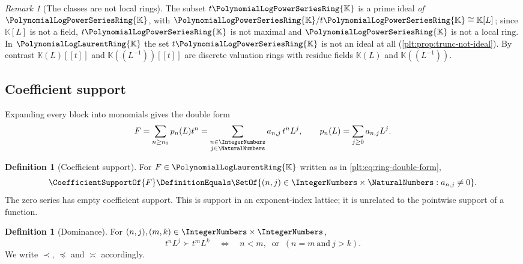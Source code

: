 \documentclass[11pt,oneside]{article}
\theoremstyle{plain}
\theoremstyle{definition}
\newtheorem{definition}[theorem]{Definition}
\theoremstyle{remark}
\newtheorem{remark}[theorem]{Remark}
\newcommand{\K}{\mathbb{K}}
\newcommand{\PLpow}{\PolynomialLogPowerSeriesRing{\K}}   %
\newcommand{\PLlau}{\PolynomialLogLaurentRing{\K}}       %
\newcommand{\precdom}{\prec}
\newcommand{\succdom}{\succ}
\newcommand{\preceqdom}{\preccurlyeq}
\newcommand{\asymdom}{\asymp}
\begin{document}
\begin{remark}[The classes are not local rings]
\label{plt:rmk:ring-not-local}
The subset \(t\PLpow\) is a prime ideal \emph{of \(\PLpow\)}, with
\(\PLpow/t\PLpow\cong\K[L]\); since \(\K[L]\) is not a field, \(t\PLpow\) is
not maximal and \(\PLpow\) is not a local ring.  In \(\PLlau\) the set
\(t\PLpow\) is not an ideal at all
(\cref{plt:prop:trunc-not-ideal}).  By contrast \(\K(L)[[t]]\) and
\(\K((L^{-1}))[[t]]\) are discrete valuation rings with residue fields
\(\K(L)\) and \(\K((L^{-1}))\).
\end{remark}

\subsection{Coefficient support}
\label{plt:sec:ring-support}

Expanding every block into monomials gives the double form
\begin{equation}\label{plt:eq:ring-double-form}
  F=\sum_{n\ge n_0}p_n(L)t^n
   =\sum_{\substack{n\in\IntegerNumbers\\ j\in\NaturalNumbers}}a_{n,j}\,t^nL^j,
  \qquad
  p_n(L)=\sum_{j\ge0}a_{n,j}L^j .
\end{equation}

\begin{definition}[Coefficient support]
\label{plt:def:ring-support}
For \(F\in\PLlau\) written as in \eqref{plt:eq:ring-double-form},
\[
  \CoefficientSupportOf{F}
  \DefinitionEquals
  \SetOf{(n,j)\in\IntegerNumbers\times\NaturalNumbers:a_{n,j}\ne0}.
\]
The zero series has empty coefficient support.  This is support in an
exponent-index lattice; it is unrelated to the pointwise support of a
function.
\end{definition}

\begin{definition}[Dominance]
\label{plt:def:ring-dominance}
For \((n,j),(m,k)\in\IntegerNumbers\times\IntegerNumbers\),
\begin{equation}\label{plt:eq:ring-dominance}
  t^nL^j\succdom t^mL^k
  \quad\Longleftrightarrow\quad
  n<m,\ \text{ or }\ (n=m\ \text{and}\ j>k).
\end{equation}
We write \(\precdom\), \(\preceqdom\) and \(\asymdom\) accordingly.
\end{definition}
\end{document}
